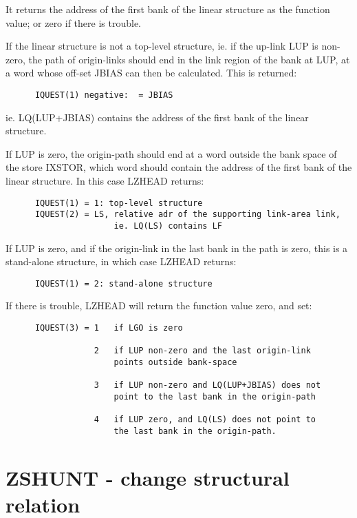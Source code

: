 

It returns the address of the first bank of the linear structure
as the function value; or zero if there is trouble.

If the linear structure is not a top-level structure,
ie. if the up-link LUP is non-zero, the path of origin-links should
end in the link region of the bank at LUP, at a word whose
off-set JBIAS can then be calculated. This is returned:
\begin{verbatim}
      IQUEST(1) negative:  = JBIAS
\end{verbatim}
ie. LQ(LUP+JBIAS) contains the address of the first bank of the
linear structure.

If LUP is zero, the origin-path should end at a word outside
the bank space of the store IXSTOR, which word
should contain the address of the first bank of the linear structure.
In this case LZHEAD returns:
\begin{verbatim}
      IQUEST(1) = 1: top-level structure
      IQUEST(2) = LS, relative adr of the supporting link-area link,
                      ie. LQ(LS) contains LF
\end{verbatim}

If LUP is zero, and if the origin-link in the last bank in the path
is zero, this is a stand-alone structure, in which case LZHEAD returns:
\begin{verbatim}
      IQUEST(1) = 2: stand-alone structure
\end{verbatim}

If there is trouble, LZHEAD will return the function value zero,
and set:
\begin{verbatim}
      IQUEST(3) = 1   if LGO is zero

                  2   if LUP non-zero and the last origin-link
                      points outside bank-space

                  3   if LUP non-zero and LQ(LUP+JBIAS) does not
                      point to the last bank in the origin-path

                  4   if LUP zero, and LQ(LS) does not point to
                      the last bank in the origin-path.
\end{verbatim}

\section{ZSHUNT - change structural relation}


